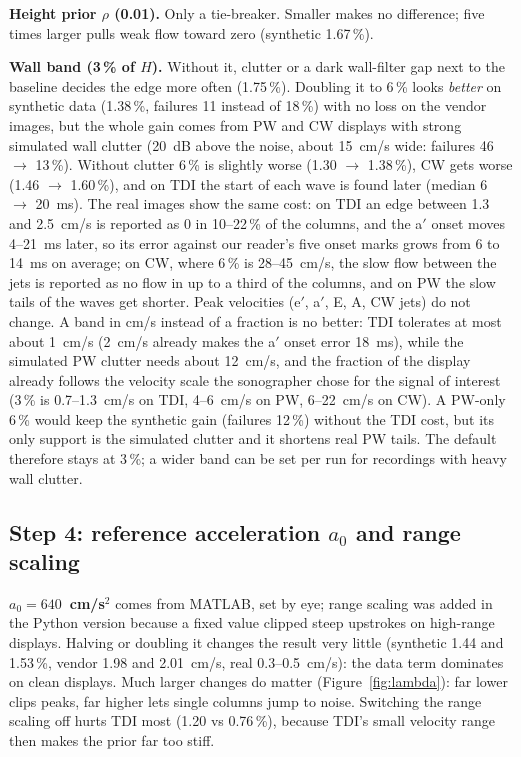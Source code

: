 \documentclass[11pt,a4paper]{article}
\begin{document}
\textbf{Height prior $\rho$ (0.01).} Only a tie-breaker. Smaller makes no difference; five times larger pulls weak flow
toward zero (synthetic 1.67\,\%).

\textbf{Wall band (3\,\% of $H$).} Without it, clutter or a dark wall-filter gap next to the baseline decides the edge
more often (1.75\,\%). Doubling it to 6\,\% looks \emph{better} on synthetic data (1.38\,\%, failures 11 instead of
18\,\%) with no loss on the vendor images, but the whole gain comes from PW and CW displays with strong simulated wall
clutter (20~dB above the noise, about 15~cm/s wide: failures 46 $\to$ 13\,\%). Without clutter 6\,\% is slightly
worse (1.30 $\to$ 1.38\,\%), CW gets worse (1.46 $\to$ 1.60\,\%), and on TDI the start of each wave is found later
(median 6 $\to$ 20~ms). The real images show the same cost: on TDI an edge between 1.3 and 2.5~cm/s is reported as 0
in 10--22\,\% of the columns, and the a$'$ onset moves 4--21~ms later, so its error against our reader's five onset
marks grows from 6 to 14~ms on average; on CW, where 6\,\% is 28--45~cm/s, the slow flow between the jets is reported
as no flow in up to a third of the columns, and on PW the slow tails of the waves get shorter. Peak velocities (e$'$,
a$'$, E, A, CW jets) do not change. A band in cm/s instead of a fraction is no better: TDI tolerates at most about
1~cm/s (2~cm/s already makes the a$'$ onset error 18~ms), while the simulated PW clutter needs about 12~cm/s, and the
fraction of the display already follows the velocity scale the sonographer chose for the signal of interest (3\,\% is
0.7--1.3~cm/s on TDI, 4--6~cm/s on PW, 6--22~cm/s on CW). A PW-only 6\,\% would keep the synthetic gain (failures
12\,\%) without the TDI cost, but its only support is the simulated clutter and it shortens real PW tails. The default
therefore stays at 3\,\%; a wider band can be set per run for recordings with heavy wall clutter.

\subsection{Step 4: reference acceleration $a_0$ and range scaling}
\textbf{$a_0 = 640$~cm/s$^2$} comes from MATLAB, set by eye; range scaling was added in the Python version because a
fixed value clipped steep upstrokes on high-range displays. Halving or doubling it changes the result very little
(synthetic 1.44 and 1.53\,\%, vendor 1.98 and 2.01~cm/s, real 0.3--0.5~cm/s): the data term dominates on clean
displays. Much larger changes do matter (Figure~\ref{fig:lambda}): far lower clips peaks, far higher lets single
columns jump to noise. Switching the range scaling off hurts TDI most (1.20 vs 0.76\,\%), because TDI's small velocity
range then makes the prior far too stiff.
\end{document}
